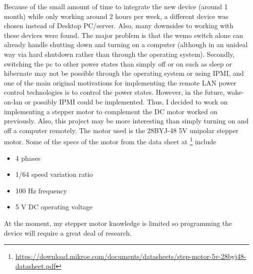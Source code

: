 \documentclass[fontsize=11pt, %
                             paper=letter, %
                             twoside, %
                             captions=tableheading,
                             index=totoc,
                             hyperref]{labbook}
\begin{document}
\begin{addmargin}[0cm]{0cm}
Because of the small amount of time to integrate the new device (around 1 month) while only working around 2 hours per week, a different device was chosen instead of Desktop PC/server. Also, many downsides to working with these devices were found. The major problem is that the wemo switch alone can already handle shutting down and turning on a computer (although in an unideal way via hard shutdown rather than through the operating system). Secondly, switching the pc to other power states than simply off or on such as sleep or hibernate may not be possible through the operating system or using IPMI, and one of the main original motivations for implementing the remote LAN power control technologies is to control the power states. However, in the future, wake-on-lan or possibly IPMI could be implemented.
\smallbreak\noindent
Thus, I decided to work on implementing a stepper motor to complement the DC motor worked on previously. Also, this project may be more interesting than simply turning on and off a computer remotely. The motor used is the 28BYJ-48 5V unipolar stepper motor. Some of the specs of the motor from the data sheet at \footnote{\url{https://download.mikroe.com/documents/datasheets/step-motor-5v-28byj48-datasheet.pdf}} include
\begin{itemize}
\item 4 phases
\item 1/64 speed variation ratio
\item 100 Hz frequency
\item 5 V DC operating voltage
\end{itemize}
At the moment, my stepper motor knowledge is limited so programming the device will require a great deal of research.


\end{addmargin}
\end{document}
